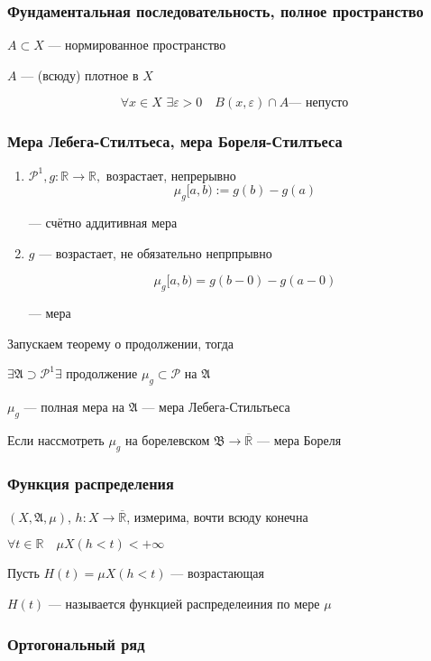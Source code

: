 \documentclass{article}
\def\dbl{\,\,}
\def\rinf{\overline{\mathbb{R}}}
\begin{document}
\subsubsection{Фундаментальная последовательность, полное пространство}

$A \subset X$ --- нормированное пространство

$A$ --- (всюду) плотное в $X$

\[\forall x \in X \dbl \exists \varepsilon > 0 \quad B(x, \varepsilon) \cap A\text{--- непусто}\]

\subsubsection{Мера Лебега-Стилтьеса, мера Бореля-Стилтьеса}

\begin{enumerate}
    \item $\mathcal{P}^{1}, g: \mathbb{R} \rightarrow \mathbb{R}, $ возрастает, непрерывно
    \[\mu_g[a, b) := g(b) - g(a)\]

    --- счётно аддитивная мера
    \item $g$ --- возрастает, не обязательно непрпрывно
    
    \[\mu_g[a, b) = g(b - 0) - g(a - 0)\]

    --- мера
\end{enumerate}

Запускаем теорему о продолжении, тогда

$\exists \mathfrak{A} \supset \mathcal{P}^{1} \exists$ продолжение $\mu_g \subset \mathcal{P}$ на $\mathfrak{A}$

$\mu_g$ --- полная мера на $\mathfrak{A}$ --- мера Лебега-Стильтьеса

Если нассмотреть $\mu_g$ на борелевском $\mathfrak{B} \rightarrow \rinf$ --- мера Бореля


\subsubsection{Функция распределения}
$(X, \mathfrak{A}, \mu)$, $h: X \rightarrow \rinf$, измерима, вочти всюду конечна

$\forall t \in \mathbb{R} \quad \mu X(h < t) < +\infty$

Пусть $H(t) = \mu X(h < t)$ --- возрастающая

$H(t)$ --- называется функцией распределеиния по мере $\mu$

\subsubsection{Ортогональный ряд}
\end{document}
